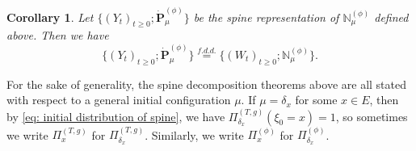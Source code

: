\documentclass[12pt, a4paper]{amsart}
\newtheorem{cro}[thm]{Corollary}
\theoremstyle{definition}
\numberwithin{equation}{section}
\begin{document}
\begin{cro}
	Let $\{(Y_t)_{t\geq 0}; \dot {\mathbf P}^{(\phi)}_\mu\}$ be the spine representation of $\mathbb N^{(\phi)}_\mu$ defined above.
	Then we have
\[
	\{(Y_t)_{t\geq 0}; \dot{\mathbf P}^{(\phi)}_\mu\}
	\overset{f.d.d.}{=} \{(W_t)_{t\geq 0}; \mathbb N_\mu^{(\phi)}\}.
\]
\end{cro}

	For the sake of generality, the spine decomposition theorems above are all stated with respect to a general initial configuration $\mu$.
	If $\mu = \delta_x$ for some $x\in E$, then by 
	\eqref{eq: initial distribution of spine}, we have $\Pi_{\delta_x}^{(T,g)} (\xi_0 = x) = 1$, so sometimes we write $\Pi_x^{(T,g)}$ for $\Pi_{\delta_x}^{(T,g)}$.
	Similarly, we write $\Pi_x^{(\phi)}$ for $\Pi_{\delta_x}^{(\phi)}$.

\end{document}
